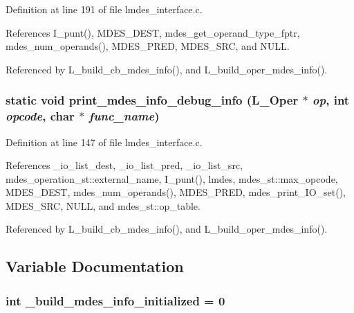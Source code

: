 Definition at line 191 of file lmdes\_\-interface.c.

References I\_\-punt(), MDES\_\-DEST, mdes\_\-get\_\-operand\_\-type\_\-fptr, mdes\_\-num\_\-operands(), MDES\_\-PRED, MDES\_\-SRC, and NULL.

Referenced by L\_\-build\_\-cb\_\-mdes\_\-info(), and L\_\-build\_\-oper\_\-mdes\_\-info().
\subsubsection{\setlength{\rightskip}{0pt plus 5cm}static void print\_\-mdes\_\-info\_\-debug\_\-info (L\_\-Oper $\ast$ {\em op}, int {\em opcode}, char $\ast$ {\em func\_\-name})\hspace{0.3cm}{\tt  [static]}}\label{lmdes__interface_8c_331d0974b7653bdd616d2b956466aad1}




Definition at line 147 of file lmdes\_\-interface.c.

References \_\-io\_\-list\_\-dest, \_\-io\_\-list\_\-pred, \_\-io\_\-list\_\-src, mdes\_\-operation\_\-st::external\_\-name, I\_\-punt(), lmdes, mdes\_\-st::max\_\-opcode, MDES\_\-DEST, mdes\_\-num\_\-operands(), MDES\_\-PRED, mdes\_\-print\_\-IO\_\-set(), MDES\_\-SRC, NULL, and mdes\_\-st::op\_\-table.

Referenced by L\_\-build\_\-cb\_\-mdes\_\-info(), and L\_\-build\_\-oper\_\-mdes\_\-info().

\subsection{Variable Documentation}
\subsubsection{\setlength{\rightskip}{0pt plus 5cm}int \bf{\_\-build\_\-mdes\_\-info\_\-initialized} = 0\hspace{0.3cm}{\tt  [static]}}\label{lmdes__interface_8c_63b6b1387c0e88a6bc5c7e3e31e1a252}




